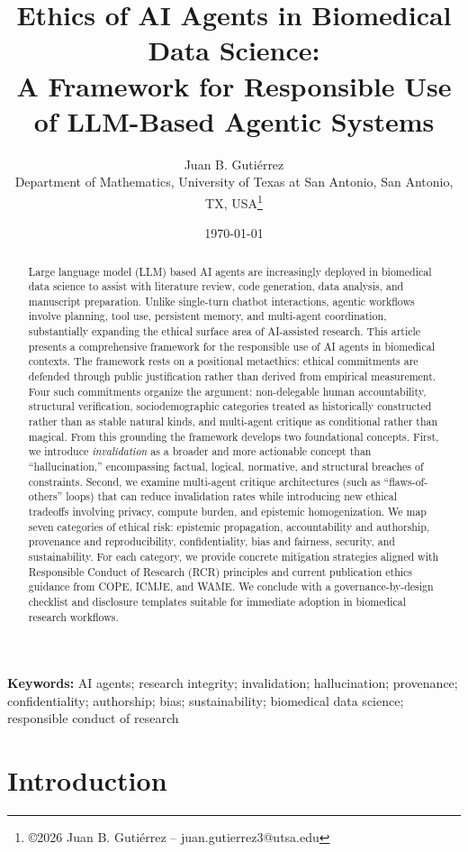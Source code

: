 \documentclass[11pt,letterpaper]{article}
\title{Ethics of AI Agents in Biomedical Data Science:\\
A Framework for Responsible Use of LLM-Based Agentic Systems}
\author{
Juan B. Guti\'errez \\[6pt]
\small Department of Mathematics, University of Texas at San Antonio, San Antonio, TX, USA\footnote{\small\copyright 2026 Juan B. Gutiérrez -- juan.gutierrez3@utsa.edu
} 
}
\date{\today}
\begin{document}
\maketitle

\begin{abstract}
Large language model (LLM) based AI agents are increasingly deployed in biomedical data science to assist with literature review, code generation, data analysis, and manuscript preparation. Unlike single-turn chatbot interactions, agentic workflows involve planning, tool use, persistent memory, and multi-agent coordination, substantially expanding the ethical surface area of AI-assisted research. This article presents a comprehensive framework for the responsible use of AI agents in biomedical contexts. The framework rests on a positional metaethics: ethical commitments are defended through public justification rather than derived from empirical measurement. Four such commitments organize the argument: non-delegable human accountability, structural verification, sociodemographic categories treated as historically constructed rather than as stable natural kinds, and multi-agent critique as conditional rather than magical. From this grounding the framework develops two foundational concepts. First, we introduce \emph{invalidation} as a broader and more actionable concept than ``hallucination,'' encompassing factual, logical, normative, and structural breaches of constraints. Second, we examine multi-agent critique architectures (such as ``flaws-of-others'' loops) that can reduce invalidation rates while introducing new ethical tradeoffs involving privacy, compute burden, and epistemic homogenization. We map seven categories of ethical risk: epistemic propagation, accountability and authorship, provenance and reproducibility, confidentiality, bias and fairness, security, and sustainability. For each category, we provide concrete mitigation strategies aligned with Responsible Conduct of Research (RCR) principles and current publication ethics guidance from COPE, ICMJE, and WAME. We conclude with a governance-by-design checklist and disclosure templates suitable for immediate adoption in biomedical research workflows.
\end{abstract}

\noindent\textbf{Keywords:} AI agents; research integrity; invalidation; hallucination; provenance; confidentiality; authorship; bias; sustainability; biomedical data science; responsible conduct of research

\section{Introduction}
\label{sec:introduction}
\end{document}
